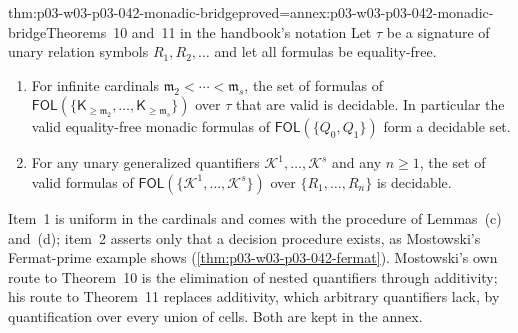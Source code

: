 \begin{hbtheorem}{thm:p03-w03-p03-042-monadic-bridge}{proved=annex:p03-w03-p03-042-monadic-bridge}{Theorems~10 and~11 in the handbook's notation}
Let \(\tau\) be a signature of unary relation symbols \(R_1,R_2,\ldots\)
and let all formulas be equality-free.
\begin{enumerate}
\item For infinite cardinals \(\mathfrak m_2<\cdots<\mathfrak m_s\), the
      set of formulas of \(\mathsf{FOL}(\{\mathsf K_{\geq\mathfrak
      m_2},\ldots,\mathsf K_{\geq\mathfrak m_s}\})\) over \(\tau\) that are
      valid is decidable.  In particular the valid equality-free monadic
      formulas of \(\mathsf{FOL}(\{Q_0,Q_1\})\) form a decidable set.
\item For any unary generalized quantifiers \(\mathcal K^1,\ldots,\mathcal
      K^s\) and any \(n\geq1\), the set of valid formulas of
      \(\mathsf{FOL}(\{\mathcal K^1,\ldots,\mathcal K^s\})\) over
      \(\{R_1,\ldots,R_n\}\) is decidable.
\end{enumerate}
\end{hbtheorem}

Item~1 is uniform in the cardinals and comes with the procedure of
Lemmas~(c) and~(d); item~2 asserts only that a decision procedure exists,
as Mostowski's Fermat-prime example shows
(\cref{thm:p03-w03-p03-042-fermat}).  Mostowski's own route to
Theorem~10 is the elimination of nested quantifiers through additivity;
his route to Theorem~11 replaces additivity, which arbitrary quantifiers
lack, by quantification over every union of cells.  Both are kept in the
annex.

